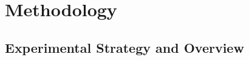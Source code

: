 
\section{Methodology}
\label{sec:methods}


\subsection{Experimental Strategy and Overview}
\label{sec:methods:overview}

